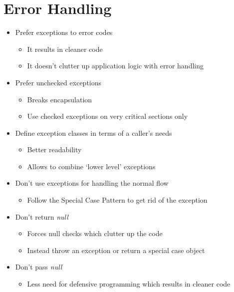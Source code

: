 \section{Error Handling}
\begin{itemize}
    \item Prefer exceptions to error codes
    \begin{itemize}
        \item It results in cleaner code
        \item It doesn't clutter up application logic with error handling
    \end{itemize}
    \item Prefer unchecked exceptions
    \begin{itemize}
        \item Breaks encapsulation
        \item Use checked exceptions on very critical sections only
    \end{itemize}
    \item Define exception classes in terms of a caller's needs
    \begin{itemize}
        \item Better readability
        \item Allows to combine `lower level' exceptions
    \end{itemize}
    \item Don't use exceptions for handling the normal flow
    \begin{itemize}
        \item Follow the Special Case Pattern to get rid of the exception
    \end{itemize}
    \item Don't return \textit{null}
    \begin{itemize}
        \item Forces null checks which clutter up the code
        \item Instead throw an exception or return a special case object
    \end{itemize}
    \item Don't pass \textit{null}
    \begin{itemize}
        \item Less need for defensive programming which results in cleaner code
    \end{itemize}
\end{itemize}

